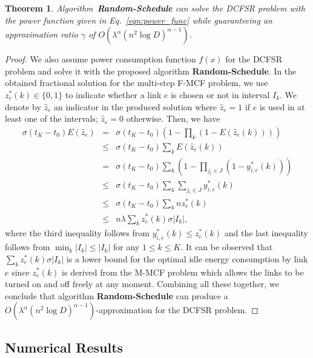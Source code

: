 \documentclass[10pt, conference, compsocconf]{IEEEtran}
\newtheorem{theorem}{Theorem}
\begin{document}
\begin{theorem}
Algorithm~\textbf{Random-Schedule} can solve the DCFSR problem with the power function given in Eq.~\ref{eqn:power_func} while guaranteeing an approximation ratio $\gamma$ of $O\left(\lambda^{\alpha} (n^2\log D)^{\alpha-1}\right)$.
\end{theorem}
\begin{proof}
We also assume power consumption function $f(x)$ for the DCFSR problem and solve it with the proposed algorithm \textbf{Random-Schedule}. In the obtained fractional solution for the multi-step F-MCF problem, we use $z^*_{e}(k) \in \{0,1\}$ to indicate whether a link $e$ is chosen or not in interval $I_k$. We denote by $\hat{z}_e$ an indicator in the produced solution where $\hat{z}_e = 1$ if $e$ is used in at least one of the intervals; $\hat{z}_e = 0$ otherwise. Then, we have
\begin{eqnarray}
\sigma(t_K-t_0)E(\hat{z}_e) &=& \sigma(t_K-t_0) \left(1-\prod_{k}(1-E(\hat{z}_e(k)))\right) \nonumber\\
			&\leq & \sigma(t_K-t_0) \sum_{k} E(\hat{z}_e(k)) \nonumber \\
			&= & \sigma(t_K-t_0) \sum_{k} \left(1-\prod_{j_i \in J} (1-y^*_{i,e}(k))\right) \nonumber\\
			&\leq& \sigma(t_K-t_0) \sum_{k} \sum_{j_i \in J} y^*_{i,e}(k) \nonumber \\
			&\leq & \sigma(t_K-t_0) \sum_{k} nz^*_{e}(k)  \\
			&\leq & n\lambda\sum_{k} z^*_{e}(k)\sigma|I_k|, \nonumber
\end{eqnarray}
where the third inequality follows from $y^*_{i,e}(k) \leq z^*_e(k)$ and the last inequality follows from $\min_{k}|I_k| \leq |I_k|$ for any $1\leq k\leq K$. It can be observed that $\sum_{k} z^*_{e}(k)\sigma|I_k|$ is a lower bound for the optimal idle energy consumption by link $e$ since $z^*_{e}(k)$ is derived from the M-MCF problem which allows the links to be turned on and off freely at any moment. Combining all these together, we conclude that algorithm \textbf{Random-Schedule} can produce a $O\left(\lambda^{\alpha}(n^2\log D)^{\alpha-1}\right)$-approximation for the DCFSR problem.
\end{proof}


\subsection{Numerical Results}
\end{document}
